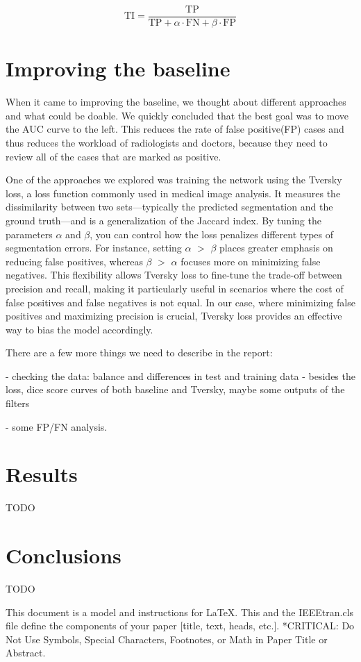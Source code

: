 \documentclass[conference]{IEEEtran}
\begin{document}
\[
\text{TI} = \frac{\text{TP}}{\text{TP} + \alpha \cdot \text{FN} + \beta \cdot \text{FP}}
\]


\section{Improving the baseline}
When it came to improving the baseline, we thought about different approaches and what could be doable. We quickly concluded that the best goal was to move the AUC curve to the left. This reduces the rate of false positive(FP) cases and thus reduces the workload of radiologists and doctors, because they need to review all of the cases that are marked as positive.

One of the approaches we explored was training the network using the Tversky loss, a loss function commonly used in medical image analysis. It measures the dissimilarity between two sets—typically the predicted segmentation and the ground truth—and is a generalization of the Jaccard index.\cite{b3} By tuning the parameters $\alpha$ and $\beta$, you can control how the loss penalizes different types of segmentation errors. For instance, setting $\alpha$ $>$ $\beta$ places greater emphasis on reducing false positives, whereas $\beta$ $>$ $\alpha$ focuses more on minimizing false negatives. This flexibility allows Tversky loss to fine-tune the trade-off between precision and recall, making it particularly useful in scenarios where the cost of false positives and false negatives is not equal. In our case, where minimizing false positives and maximizing precision is crucial, Tversky loss provides an effective way to bias the model accordingly.

There are a few more things we need to describe in the report: 

- checking the data: balance and differences in test and training data
- besides the loss, dice score curves of both baseline and Tversky, maybe some outputs of the filters

- some FP/FN analysis.


\section{Results}
TODO
\section{Conclusions}
TODO

This document is a model and instructions for \LaTeX.
This and the IEEEtran.cls file define the components of your paper [title, text, heads, etc.]. *CRITICAL: Do Not Use Symbols, Special Characters, Footnotes, 
or Math in Paper Title or Abstract.
\end{document}
